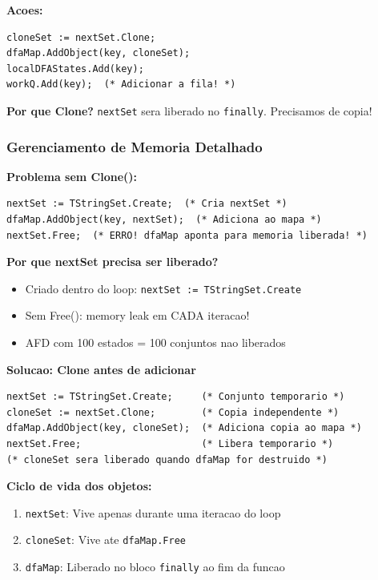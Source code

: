 \documentclass[12pt,a4paper]{article}
\begin{document}
\textbf{Acoes:}
\begin{lstlisting}[style=pascal]
cloneSet := nextSet.Clone;
dfaMap.AddObject(key, cloneSet);
localDFAStates.Add(key);
workQ.Add(key);  (* Adicionar a fila! *)
\end{lstlisting}

\textbf{Por que Clone?} \texttt{nextSet} sera liberado no \texttt{finally}. Precisamos de copia!

\subsubsection{Gerenciamento de Memoria Detalhado}

\textbf{Problema sem Clone():}
\begin{lstlisting}[style=pascal]
nextSet := TStringSet.Create;  (* Cria nextSet *)
dfaMap.AddObject(key, nextSet);  (* Adiciona ao mapa *)
nextSet.Free;  (* ERRO! dfaMap aponta para memoria liberada! *)
\end{lstlisting}

\textbf{Por que nextSet precisa ser liberado?}
\begin{itemize}
    \item Criado dentro do loop: \texttt{nextSet := TStringSet.Create}
    \item Sem Free(): memory leak em CADA iteracao!
    \item AFD com 100 estados = 100 conjuntos nao liberados
\end{itemize}

\textbf{Solucao: Clone antes de adicionar}
\begin{lstlisting}[style=pascal]
nextSet := TStringSet.Create;     (* Conjunto temporario *)
cloneSet := nextSet.Clone;        (* Copia independente *)
dfaMap.AddObject(key, cloneSet);  (* Adiciona copia ao mapa *)
nextSet.Free;                     (* Libera temporario *)
(* cloneSet sera liberado quando dfaMap for destruido *)
\end{lstlisting}

\textbf{Ciclo de vida dos objetos:}
\begin{enumerate}
    \item \texttt{nextSet}: Vive apenas durante uma iteracao do loop
    \item \texttt{cloneSet}: Vive ate \texttt{dfaMap.Free}
    \item \texttt{dfaMap}: Liberado no bloco \texttt{finally} ao fim da funcao
\end{enumerate}
\end{document}
